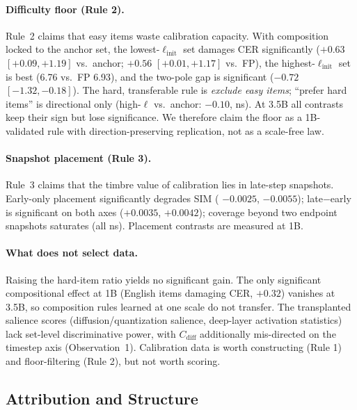 \paragraph{Difficulty floor (Rule 2).}
Rule~2 claims that easy items waste calibration capacity. With composition locked to the anchor set, the lowest-$\ell_{\text{init}}$ set damages \hard{} CER significantly ($+0.63$ $[+0.09,+1.19]$ vs.\ anchor; $+0.56$ $[+0.01,+1.17]$ vs.\ FP), the highest-$\ell_{\text{init}}$ set is best (6.76 vs.\ FP 6.93), and the two-pole gap is significant ($-0.72$ $[-1.32,-0.18]$). The hard, transferable rule is \emph{exclude easy items}; ``prefer hard items'' is directional only (high-$\ell$ vs.\ anchor: $-0.10$, ns). At 3.5B all contrasts keep their sign but lose significance. We therefore claim the floor as a 1B-validated rule with direction-preserving replication, not as a scale-free law.

\paragraph{Snapshot placement (Rule 3).}
Rule~3 claims that the timbre value of calibration lies in late-step snapshots. Early-only placement significantly degrades SIM (\zh{} $-0.0025$, \en{} $-0.0055$); late$-$early is significant on both axes ($+0.0035$, $+0.0042$); coverage beyond two endpoint snapshots saturates (all ns). Placement contrasts are measured at 1B.

\paragraph{What does not select data.}
Raising the hard-item ratio yields no significant gain. The only significant compositional effect at 1B (English items damaging \zh{} CER, $+0.32$) vanishes at 3.5B, so composition rules learned at one scale do not transfer. The transplanted salience scores (diffusion/quantization salience, deep-layer activation statistics) lack set-level discriminative power, with $C_\text{diff}$ additionally mis-directed on the timestep axis (Observation~1). Calibration data is worth constructing (Rule 1) and floor-filtering (Rule 2), but not worth scoring.

\subsection{Attribution and Structure}
\label{sec:attrexp}

